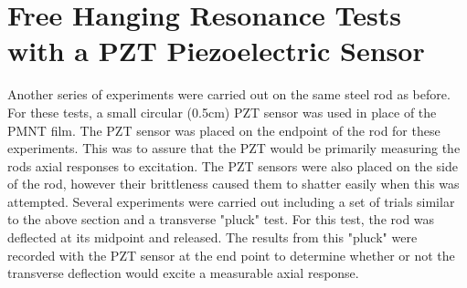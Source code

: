 \section{Free Hanging Resonance Tests with a PZT Piezoelectric Sensor}

Another series of experiments were carried out on the same steel rod as before. For these tests, a small circular (0.5cm) PZT sensor was used in place of the PMNT film. The PZT sensor was placed on the endpoint of the rod for these experiments. This was to assure that the PZT would be primarily measuring the rods axial responses to excitation. The PZT sensors were also placed on the side of the rod, however their brittleness caused them to shatter easily when this was attempted. Several experiments were carried out including a set of trials similar to the above section and a transverse "pluck" test. For this test, the rod was deflected at its midpoint and released. The results from this "pluck" were recorded with the PZT sensor at the end point to determine whether or not the transverse deflection would excite a measurable axial response.








